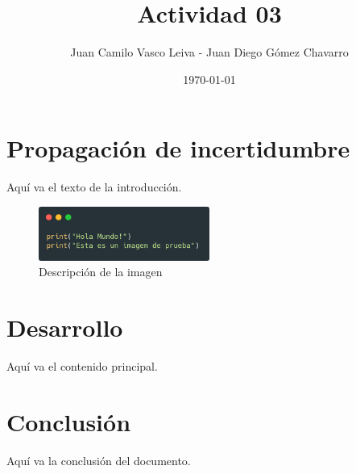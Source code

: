 \documentclass[a4paper,12pt]{article} %
\title{Actividad 03}
\author{Juan Camilo Vasco Leiva - Juan Diego G\'omez Chavarro}
\date{\today} %
\begin{document}
	
	\maketitle  %
	
	\section{Propagaci\'on de incertidumbre}
	Aquí va el texto de la introducción.
	
	\begin{figure}[h]
		\centering
		\includegraphics[width=0.5\textwidth]{imagenes/imagenPrueba.png}
		\caption{Descripción de la imagen}
		\label{fig:ejemplo}
	\end{figure}
	
	\section{Desarrollo}
	Aquí va el contenido principal.
	
	\section{Conclusión}
	Aquí va la conclusión del documento.
	
\end{document}
